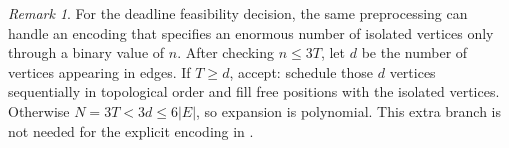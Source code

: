 \documentclass[11pt]{article}
\numberwithin{equation}{section}
\theoremstyle{definition}
\theoremstyle{remark}
\newtheorem{remark}[theorem]{Remark}
\begin{document}
\begin{remark}\label{rem:compact}
For the deadline feasibility decision, the same preprocessing can handle
an encoding that specifies an enormous number of isolated vertices only
through a binary value of \(n\).
After checking \(n\le3T\), let \(d\) be the number of vertices appearing
in edges. If \(T\ge d\), accept: schedule those \(d\) vertices sequentially
in topological order and fill free positions with the isolated vertices.
Otherwise \(N=3T<3d\le6|E|\), so expansion is polynomial. This extra
branch is not needed for the explicit encoding in .
\end{remark}





\end{document}
